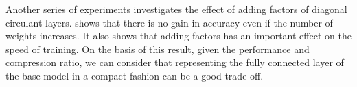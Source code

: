 Another series of experiments investigates the effect of adding factors of diagonal circulant layers.
 shows that there is no gain in accuracy even if the number of weights increases.
It also shows that adding factors has an important effect on the speed of training.
On the basis of this result, \ie given the performance and compression ratio, we can consider that representing the fully connected layer of the base model in a compact fashion can be a good trade-off.


%   



